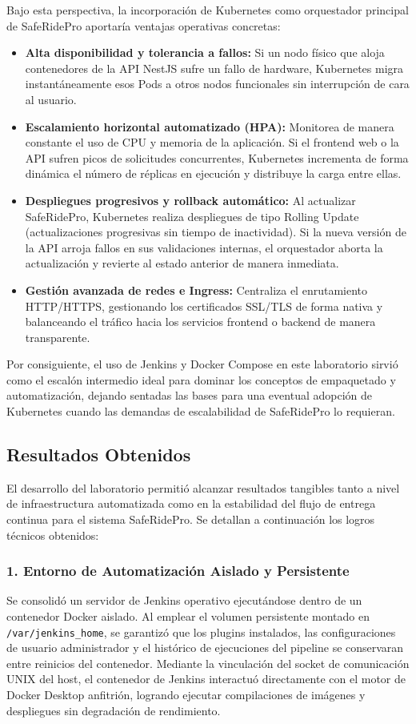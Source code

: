 \documentclass{article}
\begin{document}
Bajo esta perspectiva, la incorporación de Kubernetes como orquestador principal de SafeRidePro aportaría ventajas operativas concretas:
\begin{itemize}[leftmargin=*]
    \item \textbf{Alta disponibilidad y tolerancia a fallos:} Si un nodo físico que aloja contenedores de la API NestJS sufre un fallo de hardware, Kubernetes migra instantáneamente esos Pods a otros nodos funcionales sin interrupción de cara al usuario.
    \item \textbf{Escalamiento horizontal automatizado (HPA):} Monitorea de manera constante el uso de CPU y memoria de la aplicación. Si el frontend web o la API sufren picos de solicitudes concurrentes, Kubernetes incrementa de forma dinámica el número de réplicas en ejecución y distribuye la carga entre ellas.
    \item \textbf{Despliegues progresivos y rollback automático:} Al actualizar SafeRidePro, Kubernetes realiza despliegues de tipo Rolling Update (actualizaciones progresivas sin tiempo de inactividad). Si la nueva versión de la API arroja fallos en sus validaciones internas, el orquestador aborta la actualización y revierte al estado anterior de manera inmediata.
    \item \textbf{Gestión avanzada de redes e Ingress:} Centraliza el enrutamiento HTTP/HTTPS, gestionando los certificados SSL/TLS de forma nativa y balanceando el tráfico hacia los servicios frontend o backend de manera transparente.
\end{itemize}

Por consiguiente, el uso de Jenkins y Docker Compose en este laboratorio sirvió como el escalón intermedio ideal para dominar los conceptos de empaquetado y automatización, dejando sentadas las bases para una eventual adopción de Kubernetes cuando las demandas de escalabilidad de SafeRidePro lo requieran.

\subsection{Resultados Obtenidos}
El desarrollo del laboratorio permitió alcanzar resultados tangibles tanto a nivel de infraestructura automatizada como en la estabilidad del flujo de entrega continua para el sistema SafeRidePro. Se detallan a continuación los logros técnicos obtenidos:

\subsubsection*{1. Entorno de Automatización Aislado y Persistente}
Se consolidó un servidor de Jenkins operativo ejecutándose dentro de un contenedor Docker aislado. Al emplear el volumen persistente montado en \texttt{/var/jenkins\_home}, se garantizó que los plugins instalados, las configuraciones de usuario administrador y el histórico de ejecuciones del pipeline se conservaran entre reinicios del contenedor. Mediante la vinculación del socket de comunicación UNIX del host, el contenedor de Jenkins interactuó directamente con el motor de Docker Desktop anfitrión, logrando ejecutar compilaciones de imágenes y despliegues sin degradación de rendimiento.
\end{document}

